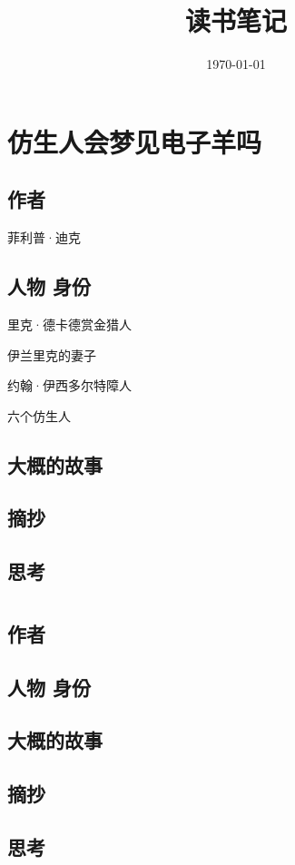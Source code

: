 \documentclass[a4paper]{article}
\title{读书笔记}
\date{\today}
\begin{document}
	\maketitle		%
	\tableofcontents	%

\section{仿生人会梦见电子羊吗}
	\subsection{作者}
	菲利普·迪克
	\subsection{人物 身份}
	里克·德卡德\quad \quad 赏金猎人
	
	伊兰\quad \quad 里克的妻子
	
	约翰·伊西多尔\quad \quad 特障人
	
	六个仿生人
	\subsection{大概的故事}
	
	\subsection{摘抄}
	
	\subsection{思考}
	
	
\section{}
\subsection{作者}

\subsection{人物 身份}

\subsection{大概的故事}

\subsection{摘抄}

\subsection{思考}	
	
	
\end{document}
